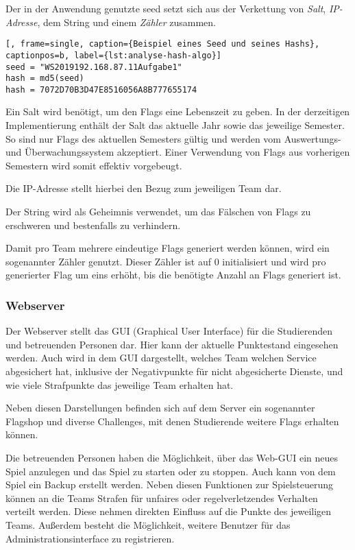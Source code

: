 Der in der Anwendung genutzte seed setzt sich aus der Verkettung von \textit{Salt}, \textit{IP-Adresse}, dem String  und einem \textit{Zähler} zusammen.

\begin{lstlisting}[, frame=single, caption={Beispiel eines Seed und seines Hashs}, captionpos=b, label={lst:analyse-hash-algo}]
seed = "WS2019192.168.87.11Aufgabe1"
hash = md5(seed)
hash = 7072D70B3D47E8516056A8B777655174
\end{lstlisting}

Ein Salt wird benötigt, um den Flags eine Lebenszeit zu geben. In der derzeitigen Implementierung enthält der Salt das aktuelle Jahr sowie das jeweilige Semester. So sind nur Flags des aktuellen Semesters gültig und werden vom Auswertungs- und Überwachungssystem akzeptiert. Einer Verwendung von Flags aus vorherigen Semestern wird somit effektiv vorgebeugt.

Die IP-Adresse stellt hierbei den Bezug zum jeweiligen Team dar.

Der String  wird als Geheimnis verwendet, um das Fälschen von Flags zu erschweren und bestenfalls zu verhindern.

Damit pro Team mehrere eindeutige Flags generiert werden können, wird ein sogenannter Zähler genutzt. Dieser Zähler ist auf 0 initialisiert und wird pro generierter Flag um eins erhöht, bis die benötigte Anzahl an Flags generiert ist. \cite[S.48]{sosnaKonzeptionUndRealisierung2010}

\subsubsection{Webserver}\label{subsubsec:Webserver}

Der Webserver stellt das GUI (Graphical User Interface) für die Studierenden und betreuenden Personen dar. Hier kann der aktuelle Punktestand eingesehen werden. Auch wird in dem GUI dargestellt, welches Team welchen Service abgesichert hat, inklusive der Negativpunkte für nicht abgesicherte Dienste, und wie viele Strafpunkte das jeweilige Team erhalten hat.

Neben diesen Darstellungen befinden sich auf dem Server ein sogenannter Flagshop und diverse Challenges, mit denen Studierende weitere Flags erhalten können.

Die betreuenden Personen haben die Möglichkeit, über das Web-GUI ein neues Spiel anzulegen und das Spiel zu starten oder zu stoppen. Auch kann von dem Spiel ein Backup erstellt werden. Neben diesen Funktionen zur Spielsteuerung können an die Teams Strafen für unfaires oder regelverletzendes Verhalten verteilt werden. Diese nehmen direkten Einfluss auf die Punkte des jeweiligen Teams. Außerdem besteht die Möglichkeit, weitere Benutzer für das Administrationsinterface zu registrieren.

